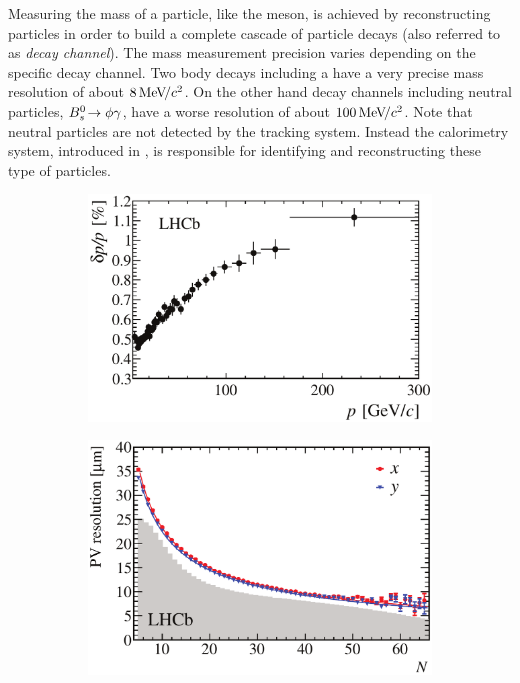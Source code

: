 Measuring the mass of a particle, like the \Bs meson, is achieved by reconstructing particles in order to build a
complete cascade of particle decays (also referred to as {\it decay channel}). The mass measurement precision varies depending
on the specific decay channel. Two body \B decays including a \jpsi have a very precise mass resolution of about
$8 {\mathrm{\,Me\kern -0.1em V\!/}c^2}$. On the other hand decay channels including neutral particles, \ie $B^0_s\!\rightarrow \phi \gamma$, have a worse
resolution of about $100 {\mathrm{\,Me\kern -0.1em V\!/}c^2}$. Note that neutral particles are not detected by the tracking system.
Instead the calorimetry system, introduced in , is responsible for identifying and
reconstructing these type of particles.

\begin{figure}[t]
  \centering
  \begin{subfigure}{0.5\textwidth}
    \raggedright
    \includegraphics[width=\textwidth]{Figures/Chapter2/dppVsp-crop-cmyk}
    \caption{}
    \label{det_deltappvp}
  \end{subfigure}%
  \hfill%
  \begin{subfigure}{0.5\textwidth}
    \raggedleft
    \includegraphics[width=\textwidth]{Figures/Chapter2/DataResXY_1PV_2012-crop-cmyk.pdf}

\end{subfigure}
\end{figure}
